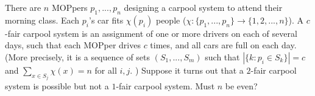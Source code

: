 There are $n$ MOPpers $p_1,...,p_n$ designing a carpool system to attend their morning class. Each $p_i$'s car fits $\chi (p_i)$ people ($\chi : \{p_1,...,p_n\} \to \{1,2,...,n\}$). A $c$-fair carpool system is an assignment of one or more drivers on each of several days, such that each MOPper drives $c$ times, and all cars are full on each day. (More precisely, it is a sequence of sets $(S_1, ...,S_m)$ such that $|\{k: p_i\in S_k\}|=c$ and $\sum_{x\in S_j} \chi(x) = n$ for all $i,j$. )
Suppose it turns out that a $2$-fair carpool system is possible but not a $1$-fair carpool system. Must $n$ be even?

